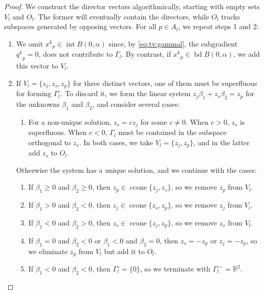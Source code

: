 \documentclass[a4paper,english]{jnsao}
\theoremstyle{definition}
\numberwithin{algorithm}{section}
\newcommand{\df}[2]{#1 ( #2 )}
\newcommand{\rea}[1]{\mathbb{R}^{#1}}
\DeclareMathOperator{\interior}{int}
\DeclareMathOperator{\boundary}{bd}
\DeclareMathOperator{\ccone}{ccone}
\newcommand{\freevar}{\,\boldsymbol\cdot\,}
\def\polar#1{#1^\circ}
\def\bipolar#1{#1^{\circ\circ}}
\begin{document}
\begin{proof}
    We construct the director vectors algorithmically, starting with empty sets $V_l$ and $O_l$. The former will eventually contain the directors, while $O_l$ tracks subspaces generated by opposing vectors.
    For all $p \in A_l$, we repeat steps 1 and 2:
    \begin{enumerate}
        \item
        We omit $x^k_{\freevar p} \in  \interior \df{B}{0,\alpha}$ since, by \cref{eq:tv:gammal}, the subgradient $q_{\freevar p}^k=0$, does not contribute to $\Gamma_l$.
        By contrast, if $x^k_{\freevar p} \in \boundary \df{B}{0,\alpha}$, we add this vector to $V_l$.

        \item
        If $V_l=\{z_{j}, z_{s}, z_{p}\}$ for three distinct vectors, one of them must be superfluous for forming $\polar\Gamma_l$.
        To discard it, we form the linear system
        $
            z_{j} \beta_1 + z_{s} \beta_2 = z_{p}
        $
        for the unknowns $\beta_1$ and $\beta_2$, and consider several cases:
        \begin{enumerate}[label=(\alph*),nosep]
            \item  For a non-unique solution, $z_{s} = c z_{j}$ for some $c \ne 0$.
            When $c > 0$, $z_s$ is superfluous.
            When $c < 0$, $\Gamma_l$ must be contained in the subspace orthogonal to $z_s$.
            In both cases, we take $V_l = \{z_{j},z_{p}\}$, and in the latter add $z_s$ to $O_l$.
        \end{enumerate}
        Otherwise the system has a unique solution, and we continue with the cases:
        \begin{enumerate}[resume*]
            \item If $\beta _1 \geq 0$ and $\beta _2 \geq 0$, then $z_{p} \in \ccone\{z_{j}, z_{s}\}$, so we remove $z_{p}$ from $V_l$.
            \item If $\beta _1 >0$ and $\beta_2 <0$, then $z_{j} \in \ccone \{z_{s}, z_{p}\}$, so we remove $z_{j}$ from $V_l$.
            \item If $\beta _1 <0$ and $\beta_2 >0$, then $z_{s} \in \ccone\{z_{j}, z_{p}\}$, so we remove $z_{s}$ from $V_l$.
            \item If $\beta _1 = 0$ and $\beta_2 <0$ or $\beta _1 < 0$ and $\beta_2 = 0$, then $z_{s} = -z_{p}$ or $z_{j} = -z_{p}$, so we eliminate $z_{p}$ from $V_l$ but add it to $O_l$.
            \item If $\beta _1 < 0$ and $\beta_2 <0$, then $\Gamma_l^\circ=\{0\}$, so we terminate with $\bipolar \Gamma_l = \rea{2}$.
        \end{enumerate}
    \end{enumerate}


\end{proof}
\end{document}
